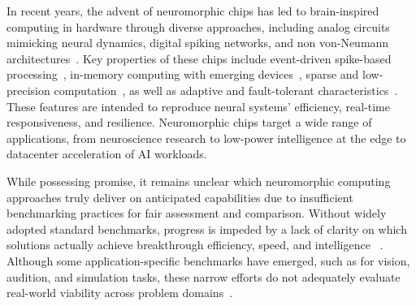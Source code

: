 In recent years, the advent of neuromorphic chips has led to brain-inspired computing in hardware through diverse approaches, including analog circuits mimicking neural dynamics, digital spiking networks, and non von-Neumann architectures~\cite{?}. Key properties of these chips include event-driven spike-based processing~\cite{?}, in-memory computing with emerging devices~\cite{?}, sparse and low-precision computation~\cite{?}, as well as adaptive and fault-tolerant characteristics~\cite{?}. These features are intended to reproduce neural systems' efficiency, real-time responsiveness, and resilience. Neuromorphic chips target a wide range of applications, from neuroscience research to low-power intelligence at the edge to datacenter acceleration of AI workloads.





While possessing promise, it remains unclear which neuromorphic computing approaches truly deliver on anticipated capabilities due to insufficient benchmarking practices for fair assessment and comparison. Without widely adopted standard benchmarks, progress is impeded by a lack of clarity on which solutions actually achieve breakthrough efficiency, speed, and intelligence ~\cite{Davies19_bencprog, Schuman2022}. Although some application-specific benchmarks have emerged, such as for vision, audition, and simulation tasks, these narrow efforts do not adequately evaluate real-world viability across problem domains~\cite{orchard2015converting,Amir_etal17_lowpowe,Cramer_2022,Ostrau2022,closedloop-andre}. 

